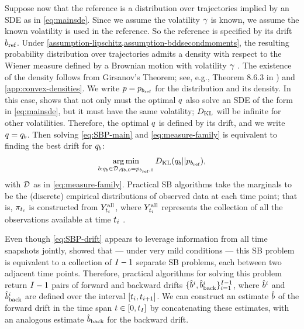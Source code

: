 Suppose now that the reference is a distribution over trajectories implied by an SDE as in \cref{eq:mainsde}. Since we assume the volatility $\gamma$ is known, we assume the known volatility is used in the reference. So the reference is specified by its drift $\refdrift$. Under \cref{assumption-lipschitz,assumption-bddsecondmoments}, the resulting probability distribution over trajectories admits a density with respect to the Wiener measure defined by a Brownian motion with volatility $\gamma$ \citep{oksendal2013stochastic, kailath1971structure}. The existence of the density follows from Girsanov's Theorem; see, e.g., Theorem 8.6.3 in \citet{oksendal2013stochastic}) and \cref{app:convex-densities}. We write $\refden = \refden_{\refdrift}$ for the distribution and its density. In this case, \citet{kailath1971structure} shows that not only must the optimal $q$ also solve an SDE of the form in \cref{eq:mainsde}, but it must have the same volatility; $D_{\mathrm{KL}}$ will be infinite for other volatilities. Therefore, the optimal $q$ is defined by its drift, and we write $\bridge = \bridge_{\modeldrift}$. Then solving \cref{eq:SBP-main} and \cref{eq:measure-family} is equivalent to finding the best drift for $\bridge_{\modeldrift}$:
\begin{align}
    \label{eq:SBP-drift}
    \argmin_{\modeldrift: \bridge_{\modeldrift} \in \measurefamily,  \bridge_{\modeldrift,0}=\refden_{\refdrift,0} }\KL(\bridge_{\modeldrift}||\refden_{\refdrift} ),
\end{align}
with $\mathcal{D}$ as in \cref{eq:measure-family}. Practical SB algorithms take the marginals to be the (discrete) empirical distributions of observed data at each time point; that is, $\pi_{t_{i}}$ is constructed from $\obsatall{\timestep{\timeidx}}$, where  $\obsatall{\timestep{\timeidx}}$ represents the collection of all the observations available at time $t_{i}$ \citep{Vargas2021, de2021diffusion}.

Even though \cref{eq:SBP-drift}  appears to leverage information from all time snapshots jointly, \citet{lavenant2024toward, chen2019multi} showed that --- under very mild conditions --- this SB problem is equivalent to a collection of $I-1$ separate SB problems, each between two adjacent time points. Therefore, practical algorithms for solving this problem return $I-1$ pairs of forward and backward drifts $\{\estimatedriftstep{i},\estimatebackwarddriftstep{i}\}_{\timeidx=1}^{\totsteps-1}$, where $\estimatedriftstep{i}$ and $\estimatebackwarddriftstep{i}$ are defined over the interval $[t_{i}, t_{i+1}]$. We can construct an estimate $\estimatedrift$ of the forward drift in the time span $t \in [0,t_{I}]$ by concatenating these estimates, with an analogous estimate $\estimatebkwdrift$ for the backward drift.

